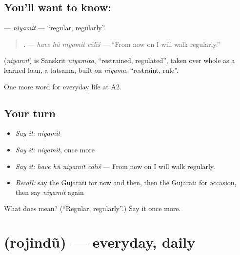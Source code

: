 \subsection*{You'll want to know: }
\textbf{} — \emph{niyamit} — \textquotedblleft{}regular, regularly\textquotedblright{}.

\begin{quote}
\textbf{   .} — \emph{have hũ niyamit cālīś} — \textquotedblleft{}From now on I will walk regularly.\textquotedblright{}
\end{quote}

\begin{cousinweb}
\textbf{} (\emph{niyamit}) is Sanskrit \emph{niyamita}, \textquotedblleft{}restrained, regulated\textquotedblright{}, taken over whole as a learned loan, a tatsama, built on \emph{niyama}, \textquotedblleft{}restraint, rule\textquotedblright{}.
\end{cousinweb}

\begin{grammarlens}[title={What you've built}]
One more word for everyday life at A2.
\end{grammarlens}

\subsection*{Your turn}
\begin{itemize}
\raggedright
  \item \emph{Say it:} \emph{niyamit}
  \item \emph{Say it:} \emph{niyamit}, once more
  \item \emph{Say it:} \emph{have hũ niyamit cālīś} — From now on I will walk regularly.
  \item \emph{Recall:} say the Gujarati for now and then, then the Gujarati for occasion, then say \emph{niyamit} again
\end{itemize}

\begin{tcolorbox}[breakable,colback=teal!4,colframe=teal!35!black,title={Before you move on}]
What does  mean? (\textquotedblleft{}Regular, regularly\textquotedblright{}.) Say it once more.
\end{tcolorbox}
\section[\texorpdfstring{\gu{રોજિંદું} (rojindũ)}{રોજિંદું (rojindũ)}]{ (rojindũ) — everyday, daily}

